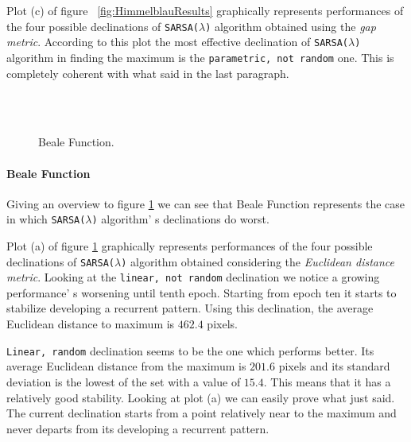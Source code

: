 Plot (c) of figure ~\ref{fig:HimmelblauResults} graphically represents performances of the four possible declinations of {\tt SARSA($\lambda$)} algorithm obtained using the \textit{gap metric}. According to this plot the most effective declination of {\tt SARSA($\lambda$)} algorithm in finding the maximum is the {\tt parametric, not random} one. This is completely coherent with what said in the last paragraph.

\begin{figure}[h!]
	\begin{center}
		\\
		 \\
		
	\end{center}
	\caption{
		Beale Function.
	}
	\label{fig:BealeResults}
\end{figure}

\paragraph{Beale Function} Giving an overview to figure \ref{fig:BealeResults} we can see that Beale Function represents the case in which {\tt SARSA($\lambda$)} algorithm' s declinations do worst. 

Plot (a) of figure \ref{fig:BealeResults} graphically represents performances of the four possible declinations of {\tt SARSA($\lambda$)} algorithm obtained considering the \textit{Euclidean distance metric}. Looking at the {\tt linear, not random} declination we notice a growing performance' s worsening until tenth epoch. Starting from epoch ten it starts to stabilize developing a recurrent pattern. Using this declination, the average Euclidean distance to maximum is $462.4$ pixels.

{\tt Linear, random} declination seems to be the one which performs better. Its average Euclidean distance from the maximum is $201.6$ pixels and its standard deviation is the lowest of the set with a value of $15.4$. This means that it has a relatively good stability. Looking at plot (a) we can easily prove what just said. The current declination starts from a point relatively near to the maximum and never departs from its developing a recurrent pattern.

